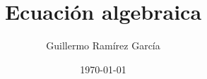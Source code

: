 \documentclass[a4paper,11pt]{report}
\begin{document}
\title{\Huge Ecuación algebraica}
\author{Guillermo Ramírez García}
\date{\today}
\maketitle
\end{document}
